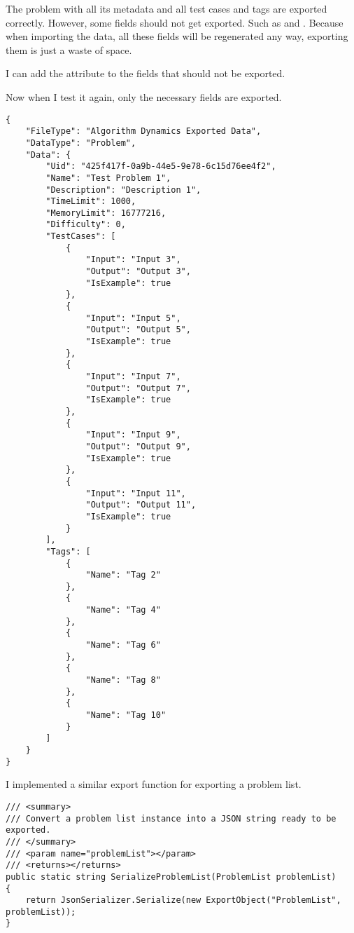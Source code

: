 \documentclass[report.tex]{subfiles}
\begin{document}
The problem with all its metadata and all test cases and tags are exported correctly. However, some fields should not get exported. Such as  and . Because when importing the data, all these fields will be regenerated any way, exporting them is just a waste of space.

I can add the \code{[JsonIgnore]} attribute to the fields that should not be exported.

Now when I test it again, only the necessary fields are exported.

\begin{verbatim}
{
    "FileType": "Algorithm Dynamics Exported Data",
    "DataType": "Problem",
    "Data": {
        "Uid": "425f417f-0a9b-44e5-9e78-6c15d76ee4f2",
        "Name": "Test Problem 1",
        "Description": "Description 1",
        "TimeLimit": 1000,
        "MemoryLimit": 16777216,
        "Difficulty": 0,
        "TestCases": [
            {
                "Input": "Input 3",
                "Output": "Output 3",
                "IsExample": true
            },
            {
                "Input": "Input 5",
                "Output": "Output 5",
                "IsExample": true
            },
            {
                "Input": "Input 7",
                "Output": "Output 7",
                "IsExample": true
            },
            {
                "Input": "Input 9",
                "Output": "Output 9",
                "IsExample": true
            },
            {
                "Input": "Input 11",
                "Output": "Output 11",
                "IsExample": true
            }
        ],
        "Tags": [
            {
                "Name": "Tag 2"
            },
            {
                "Name": "Tag 4"
            },
            {
                "Name": "Tag 6"
            },
            {
                "Name": "Tag 8"
            },
            {
                "Name": "Tag 10"
            }
        ]
    }
}
\end{verbatim}

I implemented a similar export function for exporting a problem list.

\begin{verbatim}
/// <summary>
/// Convert a problem list instance into a JSON string ready to be exported.
/// </summary>
/// <param name="problemList"></param>
/// <returns></returns>
public static string SerializeProblemList(ProblemList problemList)
{
    return JsonSerializer.Serialize(new ExportObject("ProblemList", problemList));
}
\end{verbatim}
\end{document}
